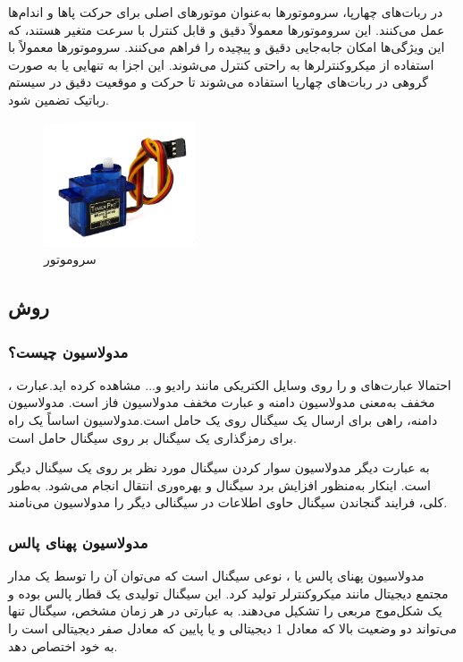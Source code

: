 در ربات‌های چهارپا، سروموتورها به‌عنوان موتورهای اصلی برای حرکت پاها و اندام‌ها عمل می‌کنند. این سروموتورها معمولاً دقیق و قابل کنترل با سرعت متغیر هستند، که این ویژگی‌ها امکان جابه‌جایی دقیق و پیچیده را فراهم می‌کنند. سروموتورها معمولاً با استفاده از میکروکنترلرها به راحتی کنترل می‌شوند. این اجزا به تنهایی یا به صورت گروهی در ربات‌های چهارپا استفاده می‌شوند تا حرکت و موقعیت دقیق در سیستم رباتیک تضمین شود.

\begin{figure}[h]
	\centering
	\includegraphics[width=0.4\textwidth]{./images/Chapter4/ServoMotor}
	\caption[سروموتور ]{سروموتور  \cite{ServoMotor}}
	\label{سروموتور}
\end{figure}

\subsection{روش }
\subsubsection{مدولاسیون چیست؟}
احتمالا عبارت‌های  و  را روی وسایل الکتریکی مانند رادیو و... مشاهده کرده اید.عبارت ، مخفف  به‌معنی مدولاسیون دامنه و عبارت  مخفف مدولاسیون فاز است. مدولاسیون دامنه، راهی برای ارسال یک سیگنال روی یک حامل است.مدولاسیون اساساً یک راه برای رمزگذاری یک سیگنال بر روی سیگنال حامل است.

به عبارت دیگر مدولاسیون سوار کردن سیگنال مورد نظر بر روی یک سیگنال دیگر است. اینکار به‌منظور افزایش برد سیگنال و بهره‌وری انتقال انجام می‌شود. به‌طور کلی، فرایند گنجاندن سیگنال حاوی اطلاعات در سیگنالی دیگر را مدولاسیون می‌نامند.

\subsubsection{مدولاسیون پهنای پالس}
مدولاسیون پهنای پالس یا  ، نوعی سیگنال است که می‌توان آن را توسط یک مدار مجتمع دیجیتال مانند میکروکنترلر تولید کرد. این سیگنال تولیدی یک قطار پالس بوده و یک شکل‌موج مربعی را تشکیل می‌دهند. به عبارتی در هر زمان مشخص، سیگنال تنها می‌تواند دو وضعیت بالا  که معادل 1 دیجیتالی و یا پایین  که معادل صفر دیجیتالی است را به خود اختصاص دهد.

